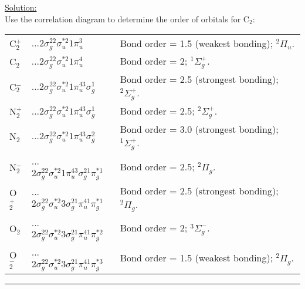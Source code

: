 \noindent
\underline{Solution:}\\

\noindent
Use the correlation diagram to determine the order of orbitals for C$_2$:\\
\begin{tabular}{lll}
C$_2^+$ & ...$2\sigma_g^22\sigma_u^{*2}1\pi_u^3$ 
& Bond order = 1.5 (weakest bonding); $^2\Pi_u$.\\
C$_2$ & ...$2\sigma_g^22\sigma_u^{*2}1\pi_u^4$ 
& Bond order = 2; $^1\Sigma_g^+$.\\
C$_2^-$ & ...$2\sigma_g^22\sigma_u^{*2}1\pi_u^43\sigma_g^1$ 
& Bond order = 2.5 (strongest bonding); $^2\Sigma_g^+$.\\

N$_2^+$ & ...$2\sigma_g^22\sigma_u^{*2}1\pi_u^43\sigma_g^1$ 
& Bond order = 2.5; $^2\Sigma_g^+$.\\
N$_2$ & ...$2\sigma_g^22\sigma_u^{*2}1\pi_u^43\sigma_g^2$ 
& Bond order = 3.0 (strongest bonding); $^1\Sigma_g^+$.\\
N$_2^-$ & ...$2\sigma_g^22\sigma_u^{*2}1\pi_u^43\sigma_g^21\pi_g^{*1}$ 
& Bond order = 2.5; $^2\Pi_g$.\\

O$_2^+$ & ...$2\sigma_g^22\sigma_u^{*2}3\sigma_g^21\pi_u^41\pi_g^{*1}$ 
& Bond order = 2.5 (strongest bonding); $^2\Pi_g$.\\
O$_2$ & ...$2\sigma_g^22\sigma_u^{*2}3\sigma_g^21\pi_u^41\pi_g^{*2}$ 
& Bond order = 2; $^3\Sigma_g^-$.\\
O$_2^-$ & ...$2\sigma_g^22\sigma_u^{*2}3\sigma_g^21\pi_u^41\pi_g^{*3}$ 
& Bond order = 1.5 (weakest bonding); $^2\Pi_g$.\\

\end{tabular}


\hrule\vspace{0.5cm}


